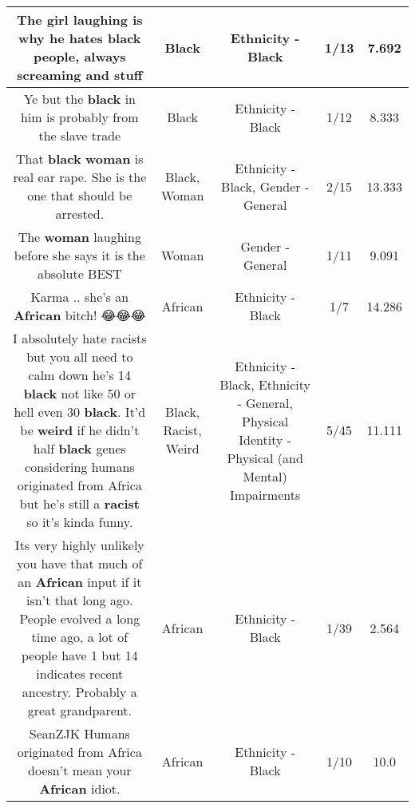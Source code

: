 \documentclass[11pt]{article}
\newlength\mylength
\begin{document}
\begin{center}
\begin{longtable}{|C{.65\mylength}|C{.30\mylength}|C{.12\mylength}|C{.12\mylength}|C{.12\mylength}|}
  \small The girl laughing is why he hates \textbf{black} people, always screaming and stuff\normalsize   & Black & Ethnicity - Black & 1/13 & 7.692 \\  \hline
  \small Ye but the \textbf{black} in him is probably from the slave trade\normalsize   & Black & Ethnicity - Black & 1/12 & 8.333 \\  \hline
  \small That \textbf{black} \textbf{woman} is real ear rape. She is the one that should be arrested.\normalsize   & Black, Woman & Ethnicity - Black, Gender - General & 2/15 & 13.333 \\  \hline
  \small The \textbf{woman} laughing before she says it is the absolute BEST\normalsize   & Woman & Gender - General & 1/11 & 9.091 \\  \hline
  \small Karma .. she's an \textbf{African} bitch! 😂😂😂\normalsize   & African & Ethnicity - Black & 1/7 & 14.286 \\  \hline
  \small I absolutely hate racists but you all need to calm down he's 14 \textbf{black} not like 50 or hell even 30 \textbf{black}. It'd be \textbf{weird} if he didn't half \textbf{black} genes considering humans originated from Africa but he's still a \textbf{racist} so it's kinda funny.\normalsize   & Black, Racist, Weird & Ethnicity - Black, Ethnicity - General, Physical Identity - Physical (and Mental) Impairments & 5/45 & 11.111 \\  \hline
  \small Its very highly unlikely you have that much of an \textbf{African} input if it isn't that long ago. People evolved a long time ago, a lot of people have 1 but 14 indicates recent ancestry. Probably a great grandparent.\normalsize   & African & Ethnicity - Black & 1/39 & 2.564 \\  \hline
  \small SeanZJK Humans originated from Africa doesn't mean your \textbf{African} idiot.\normalsize   & African & Ethnicity - Black & 1/10 & 10.0 \\  \hline

\end{longtable}
\end{center}
\end{document}
